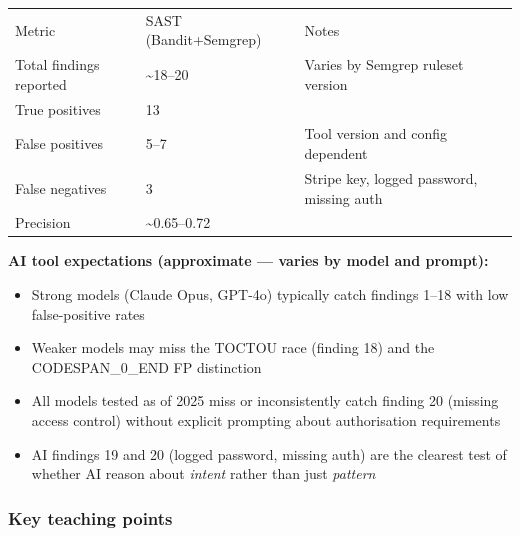 \documentclass[11pt,a4paper]{book}
\begin{document}
\begin{tabular}{lll}
\hline
Metric & SAST (Bandit+Semgrep) & Notes \\
Total findings reported & \textasciitilde{}18--20 & Varies by Semgrep ruleset version \\
True positives & 13 &  \\
False positives & 5--7 & Tool version and config dependent \\
False negatives & 3 & Stripe key, logged password, missing auth \\
Precision & \textasciitilde{}0.65--0.72 &  \\
\hline
\end{tabular}

\textbf{AI tool expectations (approximate --- varies by model and prompt):}
\begin{itemize}
  \item Strong models (Claude Opus, GPT-4o) typically catch findings 1--18 with low false-positive rates
  \item Weaker models may miss the TOCTOU race (finding 18) and the CODESPAN\_0\_END FP distinction
  \item All models tested as of 2025 miss or inconsistently catch finding 20 (missing access control) without explicit prompting about authorisation requirements
  \item AI findings 19 and 20 (logged password, missing auth) are the clearest test of whether AI reason about \textit{intent} rather than just \textit{pattern}
\end{itemize}

\subsubsection{Key teaching points}
\end{document}
